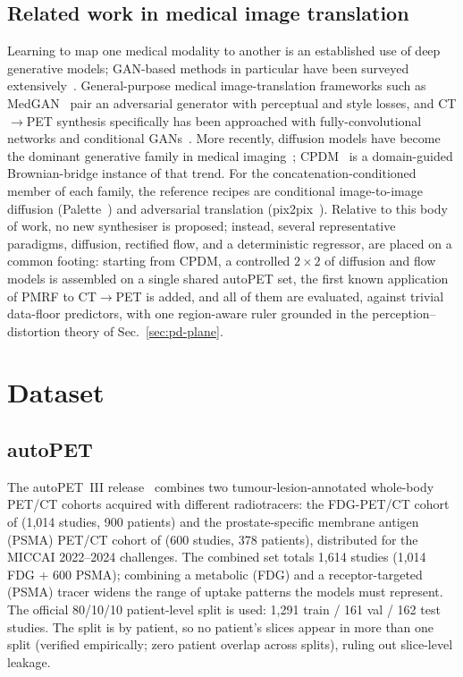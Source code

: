 \documentclass[11pt,a4paper]{article}
\newcommand{\num}[1]{#1}
\begin{document}
\subsection{Related work in medical image translation}
Learning to map one medical modality to another is an established use of deep generative models;
GAN-based methods in particular have been surveyed extensively~\parencite{yi2019gan}.
General-purpose medical image-translation frameworks such as MedGAN~\parencite{armanious2020medgan}
pair an adversarial generator with perceptual and style losses, and CT$\to$PET synthesis
specifically has been approached with fully-convolutional networks and conditional
GANs~\parencite{bencohen2019petsynth}. More recently, diffusion models have become the dominant
generative family in medical imaging~\parencite{kazerouni2023diffusion}; CPDM~\parencite{nguyen2025cpdm}
is a domain-guided Brownian-bridge instance of that trend. For the concatenation-conditioned member
of each family, the reference recipes are conditional image-to-image diffusion
(Palette~\parencite{saharia2022palette}) and adversarial translation
(pix2pix~\parencite{isola2017pix2pix}). Relative to this body of work, no new synthesiser is
proposed; instead, several representative paradigms, diffusion, rectified flow, and a deterministic
regressor, are placed on a common footing: starting from CPDM, a controlled $2\times2$ of diffusion
and flow models is assembled on a single shared autoPET set, the first known application of PMRF to
CT$\to$PET is added, and all of them are evaluated, against trivial data-floor predictors, with one
region-aware ruler grounded in the perception--distortion theory of Sec.~\ref{sec:pd-plane}.

\section{Dataset}
\label{sec:dataset}

\subsection{autoPET}
The autoPET~III release~\parencite{gatidis2022autopet, jeblick2024psma} combines two
tumour-lesion-annotated whole-body PET/CT cohorts acquired with different radiotracers:
the FDG-PET/CT cohort of \textcite{gatidis2022autopet} (1{,}014 studies, 900 patients)
and the prostate-specific membrane antigen (PSMA) PET/CT cohort of \textcite{jeblick2024psma} (600 studies, 378 patients),
distributed for the MICCAI 2022--2024 challenges. The combined set totals \num{1{,}614}
studies (1{,}014 FDG + 600 PSMA); combining a metabolic (FDG) and a receptor-targeted
(PSMA) tracer widens the range of uptake patterns the models must represent. The
official 80/10/10 patient-level split is used:
1{,}291 train / 161 val / 162 test studies. The split is by patient, so no patient's
slices appear in more than one split (verified empirically; zero patient overlap across
splits), ruling out slice-level leakage.
\end{document}
